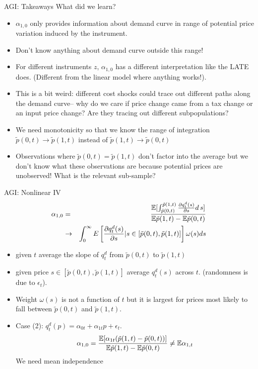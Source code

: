\begin{frame}{AGI: Takeaways}
\small
What did we learn?
\begin{itemize}
\item $\alpha_{1,0}$ only provides information about demand curve in range of potential price variation induced by the instrument.
\item Don't know anything about demand curve outside this range!
\item For different instruments $z$, $\alpha_{1,0}$ has a different interpretation like the LATE does. (Different from the linear model where anything works!).
\item This is a bit weird: different cost shocks could trace out different paths along the demand curve-- why do we care if price change came from a tax change or an input price change? Are they tracing out different subpopulations?
\item We need monotonicity so that we know the range of integration $\tilde{p}(0,t) \rightarrow \tilde{p}(1,t)$ instead of $\tilde{p}(1,t) \rightarrow \tilde{p}(0,t)$
\item Observations where $\tilde{p}(0,t) = \tilde{p}(1,t)$ don't factor into the average but we don't know what these observations are because potential prices are unobserved! What is the relevant sub-sample?
\end{itemize}
\end{frame}




\begin{frame}{AGI: Nonlinear IV}
\vspace{-0.25cm}
\begin{eqnarray*}
\alpha_{1,0} &=& \frac{\mathbb{E} [ \int_{\tilde{p}(0,t)}^{\tilde{p}(1,t)} \frac{\partial q_t^d(s)}{\partial s} d\, s]}{\mathbb{E} \tilde{p}(1,t)- \mathbb{E}\tilde{p}(0,t)}\\
 &\rightarrow& \int_0^{\infty} E\left[ \frac{\partial q_t^d(s)}{\partial s} | s \in [\tilde{p}(0,t),\tilde{p}(1,t)]\right ] \omega(s) d  s
\end{eqnarray*}
\vspace{-1cm}
\begin{itemize}
\item given $t$ average the slope of $q_t^d$ from $\tilde{p}(0,t)$ to $\tilde{p}(1,t)$
\item given price $s \in [\tilde{p}(0,t) ,\tilde{p}(1,t)]$ average $q_t^d(s)$ across $t$. (randomness is due to $\epsilon_t$).
\item Weight $\omega(s)$ is not a function of $t$ but it is largest for prices most likely to fall between $\tilde{p}(0,t)$ and $\tilde{p}(1,t)$.
\item Case (2): $q_t^d(p) = \alpha_{0t} + \alpha_{1t} p + \epsilon_t$.
\vspace{-0.25cm}
\begin{eqnarray*}
\alpha_{1,0} = \frac{\mathbb{E}[\alpha_{1t} (\tilde{p}(1,t) - \tilde{p}(0,t))]}{\mathbb{E} \tilde{p}(1,t) - \mathbb{E} \tilde{p}(0,t)} \neq \mathbb{E} \alpha_{1,t}
\end{eqnarray*}
\vspace{-0.75cm}
We need mean independence
\end{itemize}
\end{frame}


